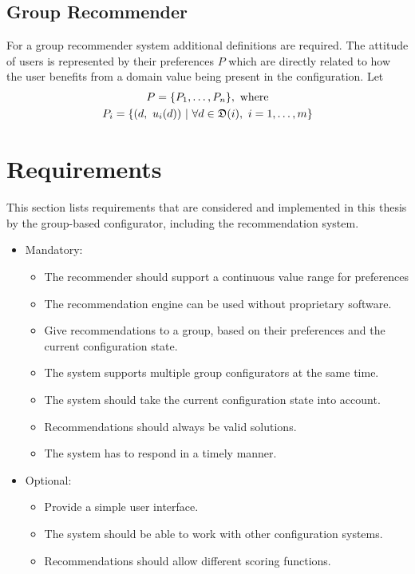 \subsection{Group Recommender}

For a group recommender system additional definitions are required. The attitude of users is represented by their preferences $P$ which are directly related to how the user benefits from a domain value being present in the configuration. Let 
\begin{gather} \label{tab:Foundations:GroupRecommenderSystem:Preferences}
    P = \{ P_1, \dotsc, P_n\},\ \text{where} \\
    P_i = \{(d,\ u_i(d)) \ | \ \forall d \in \mathfrak{D}(i),\ i=1,\dotsc,m \} \notag
\end{gather}


\section{Requirements}
\label{sec:Concept:Requirements}

This section lists requirements that are considered and implemented in this thesis by the group-based configurator, including the recommendation system.

\begin{itemize}
    \item Mandatory:
        \begin{itemize}
            \item The recommender should support a continuous value range for preferences
            \item The recommendation engine can be used without proprietary software.
            \item Give recommendations to a group, based on their preferences and the current configuration state.
            \item The system supports multiple group configurators at the same time.
            \item The system should take the current configuration state into account.

            \item Recommendations should always be valid solutions.
            \item The system has to respond in a timely manner.
        \end{itemize}
    \item Optional:
        \begin{itemize}
            \item Provide a simple user interface.
            \item The system should be able to work with other configuration systems.
            \item Recommendations should allow different scoring functions.
        \end{itemize}
\end{itemize}


